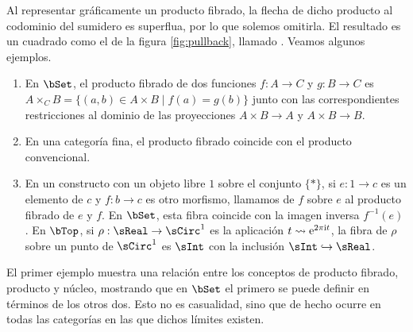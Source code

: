 Al representar gráficamente un producto fibrado, la flecha de dicho producto al
codominio del sumidero es superflua, por lo que solemos omitirla. El resultado
es un cuadrado como el de la figura \ref{fig:pullback}, llamado . Veamos algunos ejemplos.

\pagebreak
\begin{example}\;
  \begin{enumerate}
  \item En $\bSet$, el producto fibrado de dos funciones $f:A\to C$ y $g:B\to C$
    es $A\times_C B = \{(a,b) \in A \times B \mid f(a)=g(b) \}$ junto con las
    correspondientes restricciones al dominio de las proyecciones $A\times B\to A$
    y $A\times B\to B$.
  \item En una categoría fina, el producto fibrado coincide con el producto
    convencional.
  \item En un constructo con un objeto libre $1$ sobre el conjunto $\{*\}$, si
    $e:1\to c$ es un elemento de $c$ y $f:b\to c$ es otro morfismo, llamamos
     de $f$ sobre $e$ al producto fibrado de $e$ y
    $f$.\cite[p. 79]{riehl} En $\bSet$, esta fibra coincide con la imagen
    inversa $f^{-1}(e)$. En $\bTop$, si $\rho:\sReal\to\sCirc^1$ es la
    aplicación $t\rightsquigarrow\text{e}^{2\pi\text{i} t}$, la fibra de $\rho$ sobre un punto de
    $\sCirc^1$ es $\sInt$ con la inclusión $\sInt\inTo\sReal$.
  \end{enumerate}
\end{example}

El primer ejemplo muestra una relación entre los conceptos de producto fibrado,
producto y núcleo, mostrando que en $\bSet$ el primero se puede definir en
términos de los otros dos. Esto no es casualidad, sino que de hecho ocurre en
todas las categorías en las que dichos límites existen.

